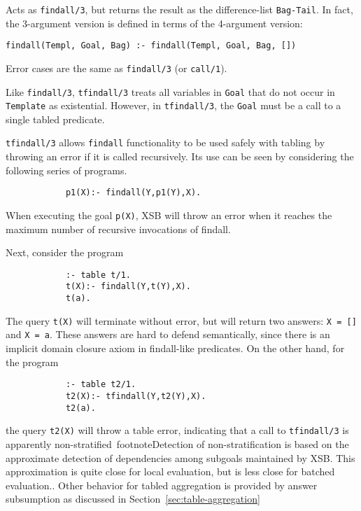 \begin{description}
%
Acts as {\tt findall/3}, but returns the result as the difference-list
{\tt Bag-Tail}. In fact, the 3-argument version is defined in terms of
the 4-argument version:
\begin{verbatim}
findall(Templ, Goal, Bag) :- findall(Templ, Goal, Bag, [])
\end{verbatim}

Error cases are the same as {\tt findall/3} (or {\tt call/1}).

%
\label{tfindall/3}

    Like {\tt findall/3}, {\tt tfindall/3} treats all variables in
    {\tt Goal} that do not occur in {\tt Template} as existential.  However,
    in {\tt tfindall/3}, the {\tt Goal} must be a call to a single
    tabled predicate.
	
    {\tt tfindall/3} allows {\tt findall} functionality to be used
    safely with tabling by throwing an error if it is called
    recursively.  Its use can be seen by considering the following
    series of programs.

    {\footnotesize
    \begin{verbatim}
            p1(X):- findall(Y,p1(Y),X).
    \end{verbatim}
} 
%
When executing the goal {\tt p(X)}, XSB will throw an error when it
reaches the maximum number of recursive invocations of findall.

Next, consider the program
    {\footnotesize
    \begin{verbatim}
            :- table t/1.
            t(X):- findall(Y,t(Y),X).
            t(a).
    \end{verbatim}
} 
%
The query {\tt t(X)} will terminate without error, but will return two
answers: {\tt X = []} and {\tt X = a}.  These answers are hard to
defend semantically, since there is an implicit domain closure axiom
in findall-like predicates.  On the other hand, for the program
%
{\footnotesize
    \begin{verbatim}
            :- table t2/1.
            t2(X):- tfindall(Y,t2(Y),X).
            t2(a).
    \end{verbatim}
}
%
the query {\tt t2(X)} will throw a table error, indicating that a call
to {\tt tfindall/3} is apparently non-stratified~footnote{Detection of
  non-stratification is based on the approximate detection of
  dependencies among subgoals maintained by XSB.  This approximation
  is quite close for local evaluation, but is less close for batched
  evaluation.}.  Other behavior for tabled aggregation is provided by
answer subsumption as discussed in Section~\ref{sec:table-aggregation}


\end{description}
